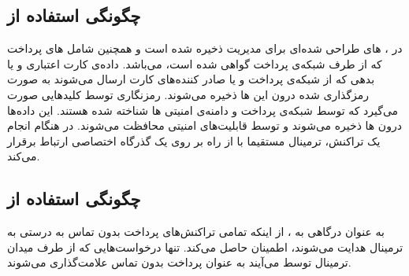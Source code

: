 \documentclass[oneside]{report}
\begin{document}
    \subsection{چگونگی استفاده {\small {}} از {\small {}}  ‌ }           
    در 
                  {\normalsize {}}
                  ،               {\normalsize {}} های طراحی شده‌ای  
                  برای مدیریت 
                                {\normalsize {}}
                                ذخیره شده است و همچنین شامل 
                                              {\normalsize {}} های پرداخت که از طرف شبکه‌ی پرداخت گواهی شده است،  می‌باشد. 
                                              داده‌ی کارت اعتباری و یا بدهی که از شبکه‌ی پرداخت و یا صادر کننده‌های کارت ارسال می‌شوند به صورت رمزگذاری شده درون این 
                                                            {\normalsize {}} ها 
     ذخیره می‌شوند. رمزنگاری توسط کلیدهایی صورت می‌گیرد که توسط شبکه‌ی پرداخت و دامنه‌ی امنیتی 
                   {\normalsize {}}ها 
                   شناخته شده هستند. این داده‌ها درون 
                                 {\normalsize {}} ها 
                                 ذخیره می‌شوند و توسط قابلیت‌های امنیتی
                                               {\normalsize {}}
                                               محافظت می‌شوند.
   در هنگام انجام یک تراکنش،  ترمینال مستقیما با 
                 {\normalsize {}}
                 از راه
                               {\normalsize {}}
                               بر روی یک گذرگاه اختصاصی ارتباط برقرار می‌کند.
                               
  
   \subsection{چگونگی استفاده {\small {}}  از {\small {}} }                                 
   به عنوان درگاهی به 
   {\normalsize {}}
   ،  {\normalsize {}}
   از اینکه تمامی تراکنش‌های پرداخت بدون تماس به درستی به ترمینال 
   {\normalsize {}}
   هدایت می‌شوند، اطمینان حاصل می‌کند.
   تنها درخواست‌هایی که از طرف میدان ترمینال توسط 
   {\normalsize {}}
   	می‌آیند به عنوان پرداخت بدون تماس علامت‌گذاری می‌شوند.
   	
\end{document}
